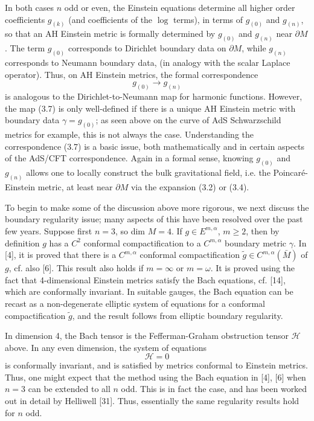\documentclass[11pt,amsfonts]{amsart}
\begin{document}
 In both cases $n$ odd or even, the Einstein equations determine all 
higher order coefficients $g_{(k)}$ (and coefficients of the $\log$ 
terms), in terms of $g_{(0)}$ and $g_{(n)}$, so that an AH Einstein 
metric is formally determined by $g_{(0)}$ and $g_{(n)}$ near $\partial M$. 
The term $g_{(0)}$ corresponds to Dirichlet boundary data on $\partial M$, 
while $g_{(n)}$ corresponds to Neumann boundary data, (in analogy with the 
scalar Laplace operator). Thus, on AH Einstein metrics, the formal 
correspondence
\begin{equation} \label{e3.7}
g_{(0)} \rightarrow  g_{(n)} 
\end{equation}
is analogous to the Dirichlet-to-Neumann map for harmonic functions. 
However, the map (3.7) is only well-defined if there is a unique AH 
Einstein metric with boundary data $\gamma  = g_{(0)}$; as seen above 
on the curve of AdS Schwarzschild metrics for example, this is not 
always the case. Understanding the correspondence (3.7) is a basic 
issue, both mathematically and in certain aspects of the AdS/CFT 
correspondence. Again in a formal sense, knowing $g_{(0)}$ and 
$g_{(n)}$ allows one to locally construct the bulk gravitational field, 
i.e. the Poincar\'e-Einstein metric, at least near $\partial M$ via the 
expansion (3.2) or (3.4). 

\medskip

 To begin to make some of the discussion above more rigorous, we next 
discuss the boundary regularity issue; many aspects of this have been 
resolved over the past few years. Suppose first $n = 3$, so dim $M  = 
4$. If $g \in  E^{m,\alpha}$, $m \geq 2$, then by definition $g$ has a 
$C^{2}$ conformal compactification to a $C^{m,\alpha}$ boundary metric 
$\gamma$. In [4], it is proved that there is a $C^{m,\alpha}$ 
conformal compactification $\widetilde g \in  C^{m,\alpha}(\bar M)$ 
of $g$, cf. also [6]. This result also holds if $m = \infty$ or $m = 
\omega$. It is proved using the fact that 4-dimensional Einstein 
metrics satisfy the Bach equations, cf. [14], which are conformally 
invariant. In suitable gauges, the Bach equation can be recast as a 
non-degenerate elliptic system of equations for a conformal compactification 
$\widetilde g$, and the result follows from elliptic boundary regularity. 

 In dimension 4, the Bach tensor is the Fefferman-Graham obstruction 
tensor ${\mathcal H}$ above. In any even dimension, the system of 
equations 
\begin{equation} \label{e3.8}
{\mathcal H}  = 0 
\end{equation}
is conformally invariant, and is satisfied by metrics conformal to 
Einstein metrics. Thus, one might expect that the method using the Bach 
equation in [4], [6] when $n = 3$ can be extended to all $n$ odd. 
This is in fact the case, and has been worked out in detail by 
Helliwell [31]. Thus, essentially the same regularity results hold 
for $n$ odd. 
\end{document}
